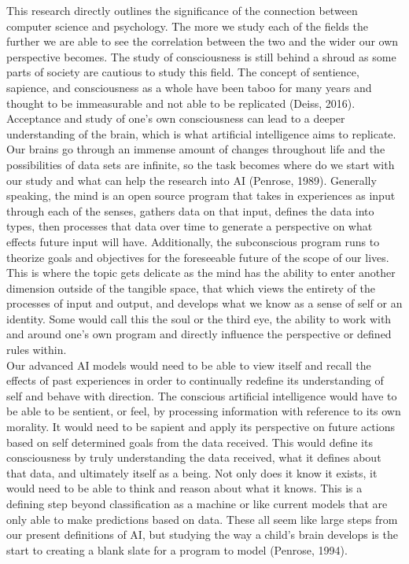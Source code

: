\documentclass[11pt]{article}
\theoremstyle{plain}
\begin{document}
This research directly outlines the significance of the connection between computer science and psychology. The more we study each of the fields the further we are able to see the correlation between the two and the wider our own perspective becomes. The study of consciousness is still behind a shroud as some parts of society are cautious to study this field. The concept of sentience, sapience, and consciousness as a whole have been taboo for many years and thought to be immeasurable and not able to be replicated (Deiss, 2016). Acceptance and study of one's own consciousness can lead to a deeper understanding of the brain, which is what artificial intelligence aims to replicate. Our brains go through an immense amount of changes throughout life and the possibilities of data sets are infinite, so the task becomes where do we start with our study and what can help the research into AI (Penrose, 1989). Generally speaking, the mind is an open source program that takes in experiences as input through each of the senses, gathers data on that input, defines the data into types, then processes that data over time to generate a perspective on what effects future input will have. Additionally, the subconscious program runs to theorize goals and objectives for the foreseeable future of the scope of our lives. This is where the topic gets delicate as the mind has the ability to enter another dimension outside of the tangible space, that which views the entirety of the processes of input and output, and develops what we know as a sense of self or an identity. Some would call this the soul or the third eye, the ability to work with and around one's own program and directly influence the perspective or defined rules within.\\

Our advanced AI models would need to be able to view itself and recall the effects of past experiences in order to continually redefine its understanding of self and behave with direction. The conscious artificial intelligence would have to be able to be sentient, or feel, by processing information with reference to its own morality. It would need to be sapient and apply its perspective on future actions based on self determined goals from the data received. This would define its consciousness by truly understanding the data received, what it defines about that data, and ultimately itself as a being. Not only does it know it exists, it would need to be able to think and reason about what it knows. This is a defining step beyond classification as a machine or like current models that are only able to make predictions based on data. These all seem like large steps from our present definitions of AI, but studying the way a child's brain develops is the start to creating a blank slate for a program to model (Penrose, 1994). \\
\end{document}
